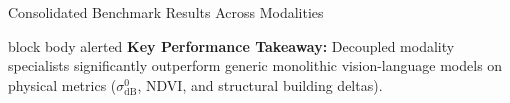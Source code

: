 \documentclass[aspectratio=169, 10pt]{beamer}
\begin{document}
\begin{frame}{Consolidated Benchmark Results Across Modalities}
  \vspace{0.15em}
  \begin{beamercolorbox}[wd=\textwidth, rounded=true, shadow=false, leftskip=2ex, rightskip=2ex]{block body alerted}
    \scriptsize\vspace{0.15em}
    \textbf{\color{IEEEAlert}Key Performance Takeaway:} Decoupled modality specialists significantly outperform generic monolithic vision-language models on physical metrics ($\sigma^0_{\text{dB}}$, NDVI, and structural building deltas).\vspace{0.15em}
  \end{beamercolorbox}
\end{frame}

\end{document}
